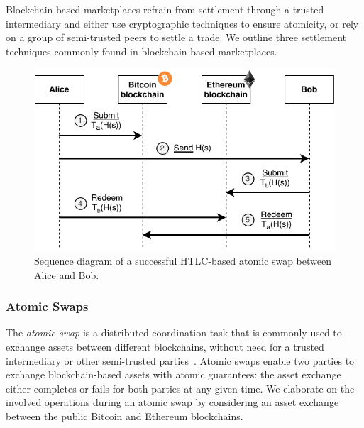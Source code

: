 
Blockchain-based marketplaces refrain from settlement through a trusted intermediary and either use cryptographic techniques to ensure atomicity, or rely on a group of semi-trusted peers to settle a trade.
We outline three settlement techniques commonly found in blockchain-based marketplaces.

\begin{figure}[t]
	\centering
	\includegraphics[width=.6\linewidth]{introduction/assets/atomic_swap}
	\caption{Sequence diagram of a successful HTLC-based atomic swap between Alice and Bob.}
	\label{fig:atomic_swap}
\end{figure}

\subsubsection{Atomic Swaps}
The \emph{atomic swap} is a distributed coordination task that is commonly used to exchange assets between different blockchains, without need for a trusted intermediary or other semi-trusted parties~\cite{herlihy2018atomic}.
Atomic swaps enable two parties to exchange blockchain-based assets with atomic guarantees: the asset exchange either completes or fails for both parties at any given time.
We elaborate on the involved operations during an atomic swap by considering an asset exchange between the public Bitcoin and Ethereum blockchains.

